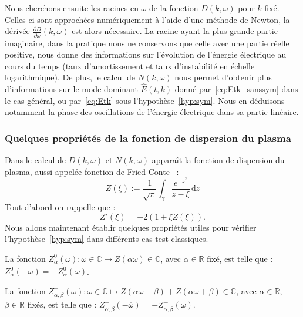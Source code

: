 Nous cherchons ensuite les racines en $\omega$ de la fonction $D(k,\omega)$ pour $k$ fixé. Celles-ci sont approchées numériquement à l'aide d'une méthode de Newton, la dérivée $\frac{\partial D}{\partial\omega}(k,\omega)$ est alors nécessaire. La racine ayant la plus grande partie imaginaire, dans la pratique nous ne conservons que celle avec une partie réelle positive, nous donne des informations sur l'évolution de l'énergie électrique au cours du temps (taux d'amortissement et taux d'instabilité en échelle logarithmique). De plus, le calcul de $N(k,\omega)$ nous permet d'obtenir plus d'informations sur le mode dominant $\hat{E}(t,k)$ donné par~\eqref{eq:Etk_sanssym} dans le cas général, ou par~\eqref{eq:Etk} sous l'hypothèse~\ref{hyp:sym}. Nous en déduisons notamment la phase des oscillations de l'énergie électrique dans sa partie linéaire.


\subsubsection{Quelques propriétés de la fonction de dispersion du plasma}

Dans le calcul de $D(k,\omega)$ et $N(k,\omega)$ apparaît la fonction de dispersion du plasma, aussi appelée fonction de Fried-Conte~\cite{Fried:1961} :
\begin{equation}
  Z(\xi):=\frac{1}{\sqrt{\pi}} \int_\gamma \frac{e^{-z^2}}{z-\xi}\,\mathrm{d}z
  \label{eq:Zfct}
\end{equation}
Tout d'abord on rappelle que :
\begin{equation}
  Z'(\xi)=-2\left(1+\xi Z(\xi)\right).
  \label{eq:Zder}
\end{equation}
Nous allons maintenant établir quelques propriétés utiles pour vérifier l'hypothèse~\ref{hyp:sym} dans différents cas test classiques.

\begin{lemma}
  La fonction $Z_\alpha^0(\omega):\omega\in\mathbb{C}\mapsto Z\left(\alpha\omega\right)\in\mathbb{C}$, avec $\alpha\in\mathbb{R}$ fixé, est telle que : $Z_\alpha^0(-\bar{\omega}) = -\overline{Z_\alpha^0(\omega)}$.
  \label{lemma:Z0}
\end{lemma}

\begin{lemma}
  La fonction $Z_{\alpha,\beta}^+(\omega):\omega\in\mathbb{C}\mapsto Z\left(\alpha\omega-\beta\right)+Z\left(\alpha\omega+\beta\right)\in\mathbb{C}$, avec $\alpha\in\mathbb{R}$, $\beta\in\mathbb{R}$ fixés, est telle que : $Z_{\alpha,\beta}^+\left(-\overline{\omega}\right)=-\overline{Z_{\alpha,\beta}^+(\omega)}$.
  \label{lemma:Z+}
\end{lemma}


